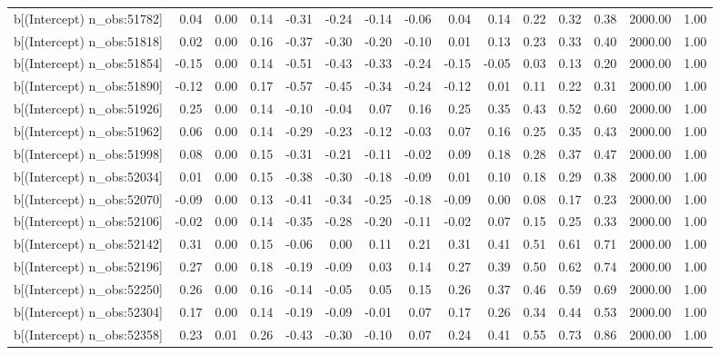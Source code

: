 \begin{table}[ht]
\begin{tabular}{rrrrrrrrrrrrrrr}
  b[(Intercept) n\_obs:51782] & 0.04 & 0.00 & 0.14 & -0.31 & -0.24 & -0.14 & -0.06 & 0.04 & 0.14 & 0.22 & 0.32 & 0.38 & 2000.00 & 1.00 \\ 
  b[(Intercept) n\_obs:51818] & 0.02 & 0.00 & 0.16 & -0.37 & -0.30 & -0.20 & -0.10 & 0.01 & 0.13 & 0.23 & 0.33 & 0.40 & 2000.00 & 1.00 \\ 
  b[(Intercept) n\_obs:51854] & -0.15 & 0.00 & 0.14 & -0.51 & -0.43 & -0.33 & -0.24 & -0.15 & -0.05 & 0.03 & 0.13 & 0.20 & 2000.00 & 1.00 \\ 
  b[(Intercept) n\_obs:51890] & -0.12 & 0.00 & 0.17 & -0.57 & -0.45 & -0.34 & -0.24 & -0.12 & 0.01 & 0.11 & 0.22 & 0.31 & 2000.00 & 1.00 \\ 
  b[(Intercept) n\_obs:51926] & 0.25 & 0.00 & 0.14 & -0.10 & -0.04 & 0.07 & 0.16 & 0.25 & 0.35 & 0.43 & 0.52 & 0.60 & 2000.00 & 1.00 \\ 
  b[(Intercept) n\_obs:51962] & 0.06 & 0.00 & 0.14 & -0.29 & -0.23 & -0.12 & -0.03 & 0.07 & 0.16 & 0.25 & 0.35 & 0.43 & 2000.00 & 1.00 \\ 
  b[(Intercept) n\_obs:51998] & 0.08 & 0.00 & 0.15 & -0.31 & -0.21 & -0.11 & -0.02 & 0.09 & 0.18 & 0.28 & 0.37 & 0.47 & 2000.00 & 1.00 \\ 
  b[(Intercept) n\_obs:52034] & 0.01 & 0.00 & 0.15 & -0.38 & -0.30 & -0.18 & -0.09 & 0.01 & 0.10 & 0.18 & 0.29 & 0.38 & 2000.00 & 1.00 \\ 
  b[(Intercept) n\_obs:52070] & -0.09 & 0.00 & 0.13 & -0.41 & -0.34 & -0.25 & -0.18 & -0.09 & 0.00 & 0.08 & 0.17 & 0.23 & 2000.00 & 1.00 \\ 
  b[(Intercept) n\_obs:52106] & -0.02 & 0.00 & 0.14 & -0.35 & -0.28 & -0.20 & -0.11 & -0.02 & 0.07 & 0.15 & 0.25 & 0.33 & 2000.00 & 1.00 \\ 
  b[(Intercept) n\_obs:52142] & 0.31 & 0.00 & 0.15 & -0.06 & 0.00 & 0.11 & 0.21 & 0.31 & 0.41 & 0.51 & 0.61 & 0.71 & 2000.00 & 1.00 \\ 
  b[(Intercept) n\_obs:52196] & 0.27 & 0.00 & 0.18 & -0.19 & -0.09 & 0.03 & 0.14 & 0.27 & 0.39 & 0.50 & 0.62 & 0.74 & 2000.00 & 1.00 \\ 
  b[(Intercept) n\_obs:52250] & 0.26 & 0.00 & 0.16 & -0.14 & -0.05 & 0.05 & 0.15 & 0.26 & 0.37 & 0.46 & 0.59 & 0.69 & 2000.00 & 1.00 \\ 
  b[(Intercept) n\_obs:52304] & 0.17 & 0.00 & 0.14 & -0.19 & -0.09 & -0.01 & 0.07 & 0.17 & 0.26 & 0.34 & 0.44 & 0.53 & 2000.00 & 1.00 \\ 
  b[(Intercept) n\_obs:52358] & 0.23 & 0.01 & 0.26 & -0.43 & -0.30 & -0.10 & 0.07 & 0.24 & 0.41 & 0.55 & 0.73 & 0.86 & 2000.00 & 1.00 \\ 

\end{tabular}
\end{table}

